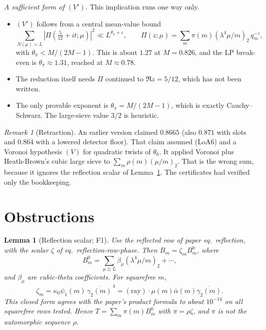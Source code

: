 \documentclass[11pt]{article}
\newtheorem{lemma}[theorem]{Lemma}
\theoremstyle{definition}
\theoremstyle{remark}
\newtheorem*{remark}{Remark}
\newcommand{\eps}{\varepsilon}
\begin{document}
\noindent\emph{A sufficient form of $(V')$.} This implication runs one way only.
\begin{itemize}[leftmargin=*]
\item $(V')$ follows from a central mean-value bound
\[
\sum_{N(\mu)\asymp L}|\Pi(\tfrac5{12}+it;\mu)|^2\ll L^{\theta_\pi+\eps},\qquad
\Pi(z;\mu)=\sum_m\pi(m)(\lambda^4\mu/m)_2\,q_m^{-z},
\]
with $\theta_\pi<M/(2M-1)$. This is about $1.27$ at $M=0.826$, and the LP break-even is $\theta_\pi\approx1.31$, reached at $M\approx0.78$.
\item The reduction itself needs $\Pi$ continued to $\Re z=5/12$, which has not been written.
\item The only provable exponent is $\theta_\pi=M/(2M-1)$, which is exactly Cauchy--Schwarz. The large-sieve value $3/2$ is heuristic.
\end{itemize}

\begin{remark}[Retraction]
An earlier version claimed $0.8665$ (also $0.871$ with slots and $0.864$ with a lowered detector floor). That claim assumed (LoA6) and a Voronoi hypothesis $(V)$ for quadratic twists of $\theta_6$. It applied Voronoi plus Heath-Brown's cubic large sieve to $\sum_m\rho(m)(\mu/m)_2$. That is the wrong sum, because it ignores the reflection scalar of Lemma~\ref{lem:Z}. The certificates had verified only the bookkeeping.
\end{remark}

\section{Obstructions}

\begin{lemma}[Reflection scalar; F1]\label{lem:Z}
Use the reflected row of paper eq.\ \emph{reflection}, with the scalar $\zeta$ of eq.\ \emph{reflection-row-phase}. Then $B_m=\zeta_m B^0_m$, where
\[
B^0_m=\sum_{\mu\lesssim L}\beta_\mu(\lambda^4\mu/m)_2+\cdots,
\]
and $\beta_\mu$ are cubic-theta coefficients. For squarefree $m$,
\[
\zeta_m=\kappa_0\psi_1(m)\,\overline{\gamma_2(m)}^{\,4}=(\mathrm{ray})\cdot\mu(m)\bar\alpha(m)\overline{\gamma_2(m)} .
\]
This closed form agrees with the paper's product formula to about $10^{-14}$ on all squarefree rows tested. Hence $T=\sum_m\pi(m)B^0_m$ with $\pi=\rho\zeta$, and $\pi$ is not the automorphic sequence $\rho$.
\end{lemma}
\end{document}
